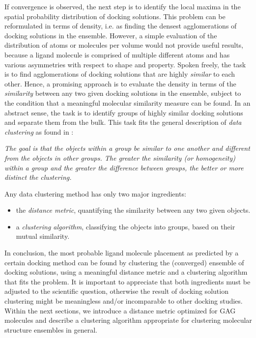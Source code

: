 If convergence is observed, the next step is to identify the local maxima in the
spatial probability distribution of docking solutions. This problem can be
reformulated in terms of density, i.e. as finding the densest agglomerations of
docking solutions in the ensemble. However, a simple evaluation of the
distribution of atoms or molecules per volume would not provide useful results,
because a ligand molecule is comprised of multiple different atoms and has
various asymmetries with respect to shape and property. Spoken freely, the task
is to find agglomerations of docking solutions that are highly \textit{similar}
to each other. Hence, a promising approach is to evaluate the density in terms
of the \textit{similarity} between any two given docking solutions in the
ensemble, subject to the condition that a meaningful molecular similarity
measure can be found. In an abstract sense, the task is to identify groups of
highly similar docking solutions and separate them from the bulk. This task fits
the general description of \textit{data clustering} as found in
\cite{tan_data_mining}:

\begin{adjustwidth}{1cm}{1cm}
\textit{
The goal is that the objects within a group be similar to one another and
different from the objects in other groups. The greater the similarity (or
homogeneity) within a group and the greater the difference between groups, the
better or more distinct the clustering.
}
\end{adjustwidth}

Any data clustering method has only two major ingredients:
\begin{itemize}
\item the \textit{distance metric}, quantifying the similarity between any two
given objects.
\item a \textit{clustering algorithm}, classifying the objects into groups,
based on their mutual similarity.
\end{itemize}

In conclusion, the most probable ligand molecule placement as predicted by a
certain docking method can be found by clustering the (converged) ensemble of
docking solutions, using a meaningful distance metric and a clustering algorithm
that fits the problem. It is important to appreciate that both ingredients must
be adjusted to the scientific question, otherwise the result of docking solution
clustering might be meaningless and/or incomparable to other docking studies.
Within the next sections, we introduce a distance metric optimized for GAG
molecules and describe a clustering algorithm appropriate for clustering
molecular structure ensembles in general.


